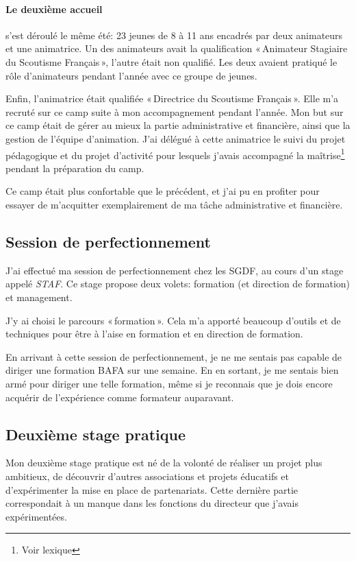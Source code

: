 \documentclass[titlepage,11pt,a4paper]{article}
\begin{document}
\paragraph{Le deuxième accueil} s'est déroulé le même été: 23 jeunes de 8 à 11 ans
encadrés par deux animateurs et une animatrice. Un des animateurs avait la qualification
«\,Animateur Stagiaire du Scoutisme Français\,», l'autre était non qualifié. Les deux
avaient pratiqué le rôle d'animateurs pendant l'année avec ce groupe de jeunes.

Enfin, l'animatrice était qualifiée «\,Directrice du Scoutisme Français\,». Elle m'a
recruté sur ce camp suite à mon accompagnement pendant l'année. Mon but sur ce camp était
de gérer au mieux la partie administrative et financière, ainsi que la gestion de l'équipe
d'animation. J'ai délégué à cette animatrice le suivi du projet pédagogique et du projet
d'activité pour lesquels j'avais accompagné la maîtrise\footnote{Voir lexique} pendant la
préparation du camp.

Ce camp était plus confortable que le précédent, et j'ai pu en profiter pour essayer
de m'acquitter exemplairement de ma tâche administrative et financière.

\subsection{Session de perfectionnement}

J'ai effectué ma session de perfectionnement chez les SGDF, au cours d'un stage appelé
\emph{STAF}. Ce stage propose deux volets: formation (et direction de formation) et
management.

J'y ai choisi le parcours «\,formation\,». Cela m'a apporté beaucoup d'outils et de
techniques pour être à l'aise en formation et en direction de formation.

En arrivant à cette session de perfectionnement, je ne me sentais pas capable de diriger une
formation BAFA sur une semaine. En en sortant, je me sentais bien armé pour diriger une
telle formation, même si je reconnais que je dois encore acquérir de l'expérience comme
formateur auparavant.

\subsection{Deuxième stage pratique}

Mon deuxième stage pratique est né de la volonté de réaliser un projet plus ambitieux, de
découvrir d'autres associations et projets éducatifs et d'expérimenter la mise en place de
partenariats. Cette dernière partie correspondait à un manque dans les fonctions du
directeur que j'avais expérimentées.
\end{document}
